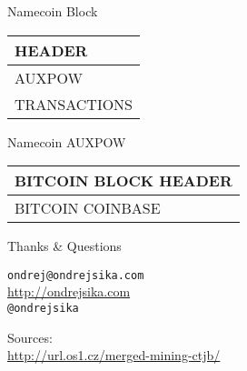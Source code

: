 \documentclass{beamer}
\begin{document}
\begin{frame}

    {\Huge Namecoin Block}\\

    \vspace{5mm}

    \begin{tabular}{|l|}
    \hline
    HEADER\\
    \hline
    AUXPOW\\
    \hline
    TRANSACTIONS\\
    \hline
    \end{tabular}

\end{frame}

\begin{frame}

    {\Huge Namecoin AUXPOW}\\

    \vspace{5mm}

    \begin{tabular}{|l|}
    \hline
    BITCOIN BLOCK HEADER\\
    \hline
    BITCOIN COINBASE \\
    \hline
    \end{tabular}

\end{frame}


\begin{frame}

    {\Huge Thanks \& Questions}\\

    \vspace{1cm}

    \texttt{ondrej@ondrejsika.com}\\
    \url{http://ondrejsika.com}\\
    \texttt{@ondrejsika}\\

    \vspace{1cm}

    Sources:\\
    \url{http://url.os1.cz/merged-mining-ctjb/}
\end{frame}
\end{document}
